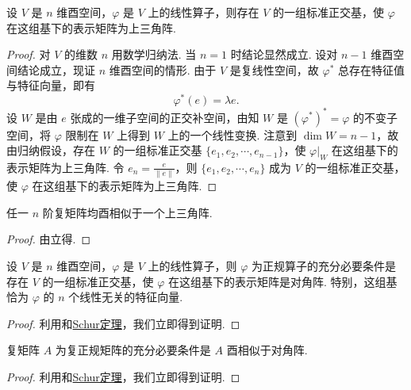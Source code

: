 \documentclass[../../main.tex]{subfiles}
\begin{document}
\begin{theorem}[Schur(舒尔)定理]\label{theorem:Schur(舒尔)定理}
设 $V$ 是 $n$ 维酉空间，$\varphi$ 是 $V$ 上的线性算子，则存在 $V$ 的一组标准正交基，使 $\varphi$ 在这组基下的表示矩阵为上三角阵.
\end{theorem}
\begin{proof}
对 $V$ 的维数 $n$ 用数学归纳法. 当 $n = 1$ 时结论显然成立. 设对 $n - 1$ 维酉空间结论成立，现证 $n$ 维酉空间的情形. 由于 $V$ 是复线性空间，故 $\varphi^*$ 总存在特征值与特征向量，即有
\[
\varphi^*(e) = \lambda e.
\]
设 $W$ 是由 $e$ 张成的一维子空间的正交补空间，由知 $W$ 是 $(\varphi^*)^* = \varphi$ 的不变子空间，将 $\varphi$ 限制在 $W$ 上得到 $W$ 上的一个线性变换. 注意到 $\dim W = n - 1$，故由归纳假设，存在 $W$ 的一组标准正交基 $\{e_1,e_2,\cdots,e_{n - 1}\}$，使 $\varphi|_W$ 在这组基下的表示矩阵为上三角阵. 令 $e_n = \frac{e}{\|e\|}$，则 $\{e_1,e_2,\cdots,e_n\}$ 成为 $V$ 的一组标准正交基，使 $\varphi$ 在这组基下的表示矩阵为上三角阵.
\end{proof}

\begin{corollary}[Schur定理]\label{corollary:Schur(舒尔)定理}
任一 $n$ 阶复矩阵均酉相似于一个上三角阵.
\end{corollary}
\begin{proof}
由立得.
\end{proof}

\begin{theorem}
设 $V$ 是 $n$ 维酉空间，$\varphi$ 是 $V$ 上的线性算子，则 $\varphi$ 为正规算子的充分必要条件是存在 $V$ 的一组标准正交基，使 $\varphi$ 在这组基下的表示矩阵是对角阵. 特别，这组基恰为 $\varphi$ 的 $n$ 个线性无关的特征向量.
\end{theorem}
\begin{proof}
利用和\hyperref[corollary:Schur(舒尔)定理]{Schur定理}，我们立即得到证明.
\end{proof}

\begin{theorem}\label{theorem:复正规矩阵等价于酉相似于对角阵的矩阵}
复矩阵 $A$ 为复正规矩阵的充分必要条件是 $A$ 酉相似于对角阵.
\end{theorem}
\begin{proof}
利用和\hyperref[theorem:Schur(舒尔)定理]{Schur定理}，我们立即得到证明.
\end{proof}
\end{document}
